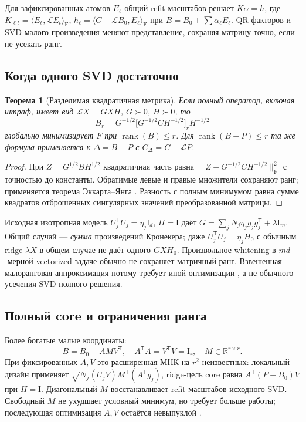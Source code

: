 \documentclass[11pt,a4paper]{article}
\newcommand{\R}{\mathbb R}
\newcommand{\Id}{\mathrm I}
\newcommand{\T}{^{\mathsf T}}
\newcommand{\F}{_{\mathrm F}}
\newcommand{\ip}[2]{\langle #1,#2\rangle_{\mathrm F}}
\DeclareMathOperator{\rank}{rank}
\newtheorem{theorem}[proposition]{Теорема}
\begin{document}
Для зафиксированных атомов $E_\ell$ общий refit масштабов решает
$K\alpha=h$, где $K_{\ell t}=\ip{E_\ell}{\mathcal LE_t}$,
$h_\ell=\ip{C-\mathcal LB_0}{E_\ell}$ при
$B=B_0+\sum\alpha_\ell E_\ell$. QR факторов и SVD малого произведения
меняют представление, сохраняя матрицу точно, если не усекать ранг.

\subsection{Когда одного SVD достаточно}
\begin{theorem}[Разделимая квадратичная метрика]\label{thm:svd}
Если \emph{полный} оператор, включая штраф, имеет вид
$\mathcal LX=G XH$, $G\succ0$, $H\succ0$, то
\begin{equation}\label{eq:exactsvd}
 B_r=G^{-1/2}\bigl[G^{-1/2}CH^{-1/2}\bigr]_rH^{-1/2}
\end{equation}
глобально минимизирует $F$ при $\rank(B)\le r$.
Для $\rank(B-P)\le r$ та же формула применяется к $\Delta=B-P$
с $C_\Delta=C-\mathcal LP$.
\end{theorem}
\begin{proof}
При $Z=G^{1/2}BH^{1/2}$ квадратичная часть равна
$\|Z-G^{-1/2}CH^{-1/2}\|\F^2$ с точностью до константы.
Обратимые левые и правые множители сохраняют ранг; применяется
теорема Эккарта--Янга \cite{eckart}. Разность с полным минимумом равна
сумме квадратов отброшенных сингулярных значений преобразованной матрицы.
\end{proof}

Исходная изотропная модель $U_j\T U_j=\eta_j\Id_d$, $H=\Id$ даёт
$G=\sum_jN_j\eta_jg_jg_j\T+\lambda\Id_m$.
Общий случай --- \emph{сумма} произведений Кронекера;
даже $U_j\T U_j=\eta_jH_0$ с обычным ridge $\lambda X$ в общем случае
не даёт одного $GXH_0$. Произвольное whitening в $md$-мерной
vectorized задаче обычно не сохраняет матричный ранг.
Взвешенная малоранговая аппроксимация потому требует иной оптимизации
\cite{weighted,mishra}, а не обычного усечения SVD полного решения.

\subsection{Полный core и ограничения ранга}
Более богатые малые координаты:
\begin{equation}\label{eq:core}
 B=B_0+A M V\T,\quad A\T A=V\T V=\Id_r,\quad M\in\R^{r\times r}.
\end{equation}
При фиксированных $A,V$ это расширенная МНК на $r^2$ неизвестных:
локальный дизайн применяет $\sqrt{N_j}(U_jV)M\T(A\T g_j)$,
ridge-цель core равна $A\T(P-B_0)V$ при $H=\Id$.
Диагональный $M$ восстанавливает refit масштабов исходного SVD.
Свободный $M$ не ухудшает условный минимум, но требует больше работы;
последующая оптимизация $A,V$ остаётся невыпуклой \cite{mishra}.
\end{document}
